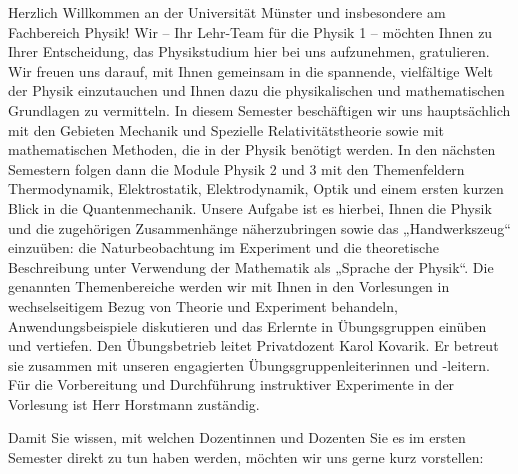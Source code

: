 \begin{multicols}{2}

Herzlich Willkommen an der Universität Münster und insbesondere am Fachbereich Physik! Wir – Ihr 
Lehr-Team für die Physik 1 – möchten Ihnen zu Ihrer Entscheidung, das Physikstudium hier bei uns 
aufzunehmen, gratulieren. Wir freuen uns darauf, mit Ihnen gemeinsam in die spannende, vielfältige 
Welt der Physik einzutauchen und Ihnen dazu die physikalischen und mathematischen Grundlagen zu 
vermitteln. In diesem Semester beschäftigen wir uns hauptsächlich mit den Gebieten Mechanik und 
Spezielle Relativitätstheorie sowie mit mathematischen Methoden, die in der Physik benötigt werden. 
In den nächsten Semestern folgen dann die Module Physik 2 und 3 mit den Themenfeldern 
Thermodynamik, Elektrostatik, Elektrodynamik, Optik und einem ersten kurzen Blick in die 
Quantenmechanik. Unsere Aufgabe ist es hierbei, Ihnen die Physik und die zugehörigen 
Zusammenhänge näherzubringen sowie das „Handwerkszeug“ einzuüben:  die Naturbeobachtung im 
Experiment und die theoretische Beschreibung unter Verwendung der Mathematik als „Sprache der 
Physik“. Die genannten Themenbereiche werden wir mit Ihnen in den Vorlesungen in wechselseitigem 
Bezug von Theorie und Experiment behandeln, Anwendungsbeispiele diskutieren und das Erlernte in 
Übungsgruppen einüben und vertiefen. Den Übungsbetrieb leitet Privatdozent Karol Kovarik. Er 
betreut sie zusammen mit unseren engagierten Übungsgruppenleiterinnen und -leitern. Für die 
Vorbereitung und Durchführung instruktiver Experimente in der Vorlesung ist Herr Horstmann 
zuständig. 

Damit Sie wissen, mit welchen Dozentinnen und Dozenten Sie es im ersten Semester direkt zu tun 
haben werden, möchten wir uns gerne kurz vorstellen:


\end{multicols}
